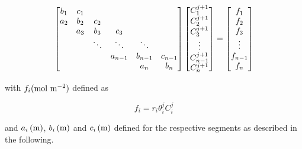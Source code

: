 \begin{equation}
  \label{matrix}
  \left [ \begin{matrix}
 b_1 & c_1 & & & &  \\
 a_2 & b_2 & c_2 & & &  \\
  & a_3 & b_3 & c_3 & &  \\
  &  & \ddots & \ddots & \ddots &  \\
  &  & & a_{n-1} & b_{n-1} & c_{n-1}  \\
  &  & & & a_{n} & b_{n}  \cr \end{matrix}  \right]
  \left [ \begin{matrix}
 C^{j+1}_1 \\
 C^{j+1}_2 \\
 C^{j+1}_3 \\
 \vdots \\
 C^{j+1}_{n-1} \\
 C^{j+1}_n \\ \end{matrix} \right ]
=
\left [ \begin{matrix}
 f_1 \\
 f_2 \\
 f_3 \\
 \vdots \\
 f_{n-1} \\
 f_n \\ \end{matrix} \right ]
\end{equation}

\noindent
with $f_i \hbox{(mol m$^{-2}$)}$ defined as

\begin{equation}
f_i = r_i \theta^j_ i C^j_i
\end{equation}

\noindent
and $a_i\, \hbox{(m)}$, $b_i\, \hbox{(m)}$ and $c_i\, \hbox{(m)}$ defined for the respective segments as described in the following.

